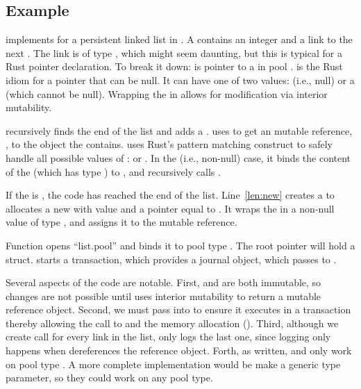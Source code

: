 \subsection{Example}

 implements  for a persistent linked list in \this{}.  A  contains an integer and a link to the next .  The link is of type , which might seem daunting, but this is typical for a Rust pointer declaration.  To break it down:  is pointer to a  in pool .   is the Rust idiom for a pointer that can be null.  It can have one of two values:  (i.e., null) or a  (which cannot be null).  Wrapping the  in  allows for modification via interior mutability.

 recursively finds the end of the list and adds a .   uses  to get an mutable reference, , to the  object the  contains.    uses Rust's pattern matching  construct to safely handle all possible values of :  or .  In the  (i.e., non-null) case, it binds the content of the  (which has type ) to , and recursively calls .

If the  is , the code has reached the end of the list.  Line~\ref{len:new} creates a  to allocates a new  with value  and a  pointer equal to .  It wraps the  in a non-null value of type , and assigns it to the mutable reference.


Function  opens ``list.pool'' and binds it to pool type .  The root pointer will hold a  struct.   starts a transaction, which provides a journal object, which  passes to .

Several aspects of the code are notable.  First,  and  are both immutable, so changes are not possible until  uses interior mutability to return a mutable reference object.  Second, we must pass  into  to ensure it executes in a transaction thereby allowing the call to   and the memory allocation ().  Third, although we create call  for every link in the list, \this{} only logs the last one, since logging only happens when  dereferences the reference object.  Forth, as written,  and  only work on pool type .  A more complete implementation would be make  a generic type parameter, so they could work on any pool type.


